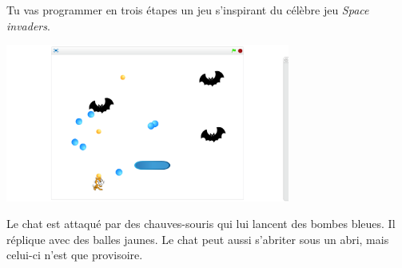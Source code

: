 \documentclass[class=report,crop=false, 12pt]{standalone}
\begin{document}




\bigskip
\bigskip


Tu vas programmer en trois étapes un jeu s'inspirant du célèbre jeu \emph{Space invaders}.

\begin{center}
  \includegraphics[width=0.7\textwidth]{ecran-10-ex0} 
\end{center}

Le chat est attaqué par des chauves-souris qui lui lancent des bombes bleues. Il réplique avec des balles jaunes. Le chat peut aussi s'abriter sous un abri, mais celui-ci n'est que provisoire. 
\end{document}
